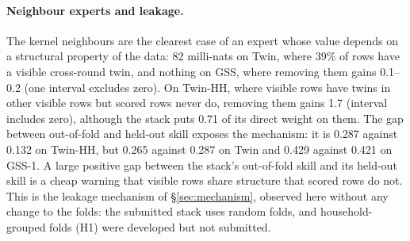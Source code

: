 \paragraph{Neighbour experts and leakage.} The kernel neighbours are the clearest case of an expert whose value depends on a structural property of the data: 82 milli-nats on Twin, where 39\% of rows have a visible cross-round twin, and nothing on GSS, where removing them gains 0.1--0.2 (one interval excludes zero). On Twin-HH, where visible rows have twins in other visible rows but scored rows never do, removing them gains 1.7 (interval includes zero), although the stack puts 0.71 of its direct weight on them. The gap between out-of-fold and held-out skill exposes the mechanism: it is 0.287 against 0.132 on Twin-HH, but 0.265 against 0.287 on Twin and 0.429 against 0.421 on GSS-1. A large positive gap between the stack's out-of-fold skill and its held-out skill is a cheap warning that visible rows share structure that scored rows do not. This is the leakage mechanism of \S\ref{sec:mechanism}, observed here without any change to the folds: the submitted stack uses random folds, and household-grouped folds (H1) were developed but not submitted.
